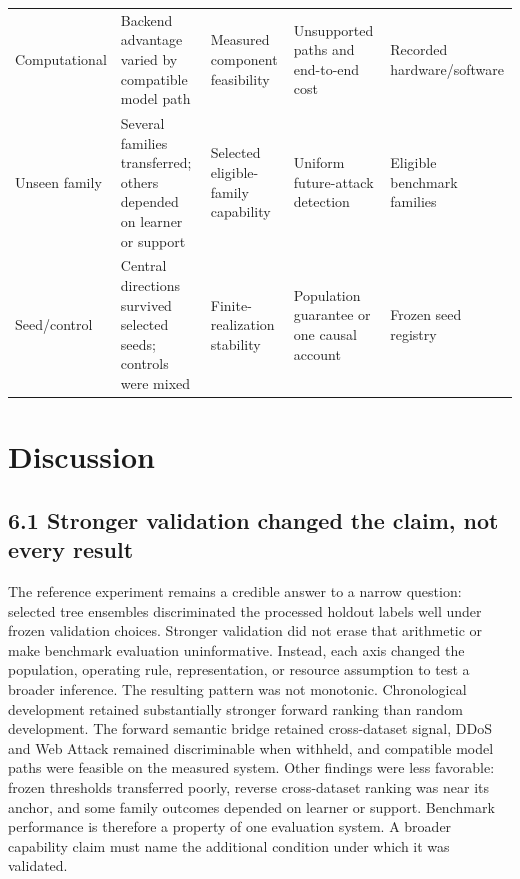 \documentclass[preprint,12pt]{elsarticle}
\begin{document}
\begin{table}[htbp]
\begin{tabularx}{\textwidth}{@{}XXXXX@{}}
Computational & Backend advantage varied by compatible model path & Measured component feasibility & Unsupported paths and end-to-end cost & Recorded hardware/software \\
Unseen family & Several families transferred; others depended on learner or support & Selected eligible-family capability & Uniform future-attack detection & Eligible benchmark families \\
Seed/control & Central directions survived selected seeds; controls were mixed & Finite-realization stability & Population guarantee or one causal account & Frozen seed registry \\
\bottomrule
\end{tabularx}
\end{table}

\section{Discussion}

\subsection{6.1 Stronger validation changed the claim, not every result}
The reference experiment remains a credible answer to a narrow question: selected tree ensembles discriminated the processed holdout labels well under frozen validation choices. Stronger validation did not erase that arithmetic or make benchmark evaluation uninformative. Instead, each axis changed the population, operating rule, representation, or resource assumption to test a broader inference.
The resulting pattern was not monotonic. Chronological development retained substantially stronger forward ranking than random development. The forward semantic bridge retained cross-dataset signal, DDoS and Web Attack remained discriminable when withheld, and compatible model paths were feasible on the measured system. Other findings were less favorable: frozen thresholds transferred poorly, reverse cross-dataset ranking was near its anchor, and some family outcomes depended on learner or support. Benchmark performance is therefore a property of one evaluation system. A broader capability claim must name the additional condition under which it was validated.
\end{document}
